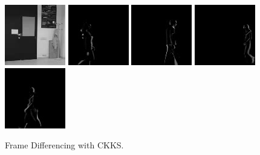     \begin{subfigure}[t]{0.9\textwidth}
        \centering
        \includegraphics[scale=0.7]{figures/LASIESTA-CKKS-DIFFERENCING/frame0}
        \hfill
        \includegraphics[scale=0.7]{figures/LASIESTA-CKKS-DIFFERENCING/frame100}
        \hfill
        \includegraphics[scale=0.7]{figures/LASIESTA-CKKS-DIFFERENCING/frame190}
        \hfill
        \includegraphics[scale=0.7]{figures/LASIESTA-CKKS-DIFFERENCING/frame250}
        \hfill
        \includegraphics[scale=0.7]{figures/LASIESTA-CKKS-DIFFERENCING/frame270}
        \caption{Frame Differencing with CKKS.}
    \end{subfigure}
    \\ \bigskip
